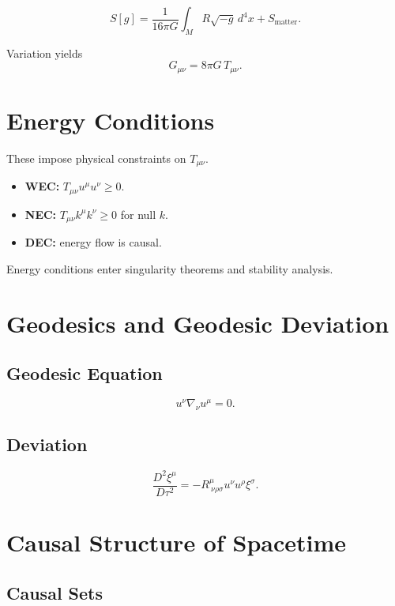 \documentclass[12pt]{article}
\begin{document}
\[
S[g] = \frac{1}{16\pi G}\int_M R\sqrt{-g}\, d^4x + S_{\text{matter}}.
\]

Variation yields
\[
G_{\mu\nu}=8\pi G\,T_{\mu\nu}.
\]

\section{Energy Conditions}

These impose physical constraints on $T_{\mu\nu}$.

\begin{itemize}
\item \textbf{WEC:} $T_{\mu\nu}u^\mu u^\nu\ge0$.
\item \textbf{NEC:} $T_{\mu\nu}k^\mu k^\nu\ge0$ for null $k$.
\item \textbf{DEC:} energy flow is causal.
\end{itemize}

Energy conditions enter singularity theorems and stability analysis.

\section{Geodesics and Geodesic Deviation}

\subsection{Geodesic Equation}

\[
u^\nu\nabla_\nu u^\mu = 0.
\]

\subsection{Deviation}

\[
\frac{D^2\xi^\mu}{D\tau^2}
= -R^\mu_{\ \nu\rho\sigma}u^\nu u^\rho \xi^\sigma.
\]

\section{Causal Structure of Spacetime}

\subsection{Causal Sets}
\end{document}

